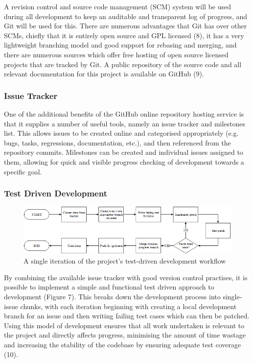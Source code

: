 A revision control and source code management (SCM) system will be used during
all development to keep an auditable and transparent log of progress, and Git
will be used for this. There are numerous advantages that Git has over other
SCMs, chiefly that it is entirely open source and GPL licensed (8), it has a
very lightweight branching model and good support for rebasing and merging, and
there are numerous sources which offer free hosting of open source licensed
projects that are tracked by Git. A public repository of the source code and all
relevant documentation for this project is available on GitHub (9).

\subsubsection{Issue Tracker}

One of the additional benefits of the GitHub online repository hosting service
is that it supplies a number of useful tools, namely an issue tracker and
milestones list. This allows issues to be created online and categorised
appropriately (e.g. bugs, tasks, regressions, documentation, etc.), and then
referenced from the repository commits.  Milestones can be created and
individual issues assigned to them, allowing for quick and visible progress
checking of development towards a specific goal.

\subsubsection{Test Driven Development}

\begin{figure}[H]
\centering
\includegraphics{assets/flow-tdd.png}
\caption{A single iteration of the project’s test-driven development workflow}
\label{fig:flow-tdd}
\end{figure}

By combining the available issue tracker with good version control practises, it
is possible to implement a simple and functional test driven approach to
development (Figure 7). This breaks down the development process into
single-issue chunks, with each iteration beginning with creating a local
development branch for an issue and then writing failing test cases which can
then be patched. Using this model of development ensures that all work
undertaken is relevant to the project and directly affects progress, minimising
the amount of time wastage and increasing the stability of the codebase by
ensuring adequate test coverage (10).
